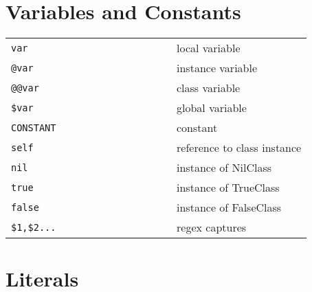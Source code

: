 \documentclass[6pt]{article}
\begin{document}
\begin{multicols}{3}
  \section{Variables and Constants}
  \begin{tabular}{L{0.55\linewidth} L{0.45\linewidth}}
    \tt var        & local variable              \\
    \tt @var       & instance variable           \\
    \tt @@var      & class variable              \\
    \tt \$var      & global variable             \\
    \tt CONSTANT   & constant                    \\
    \tt self       & reference to class instance \\
    \tt nil        & instance of NilClass        \\
    \tt true       & instance of TrueClass       \\
    \tt false      & instance of FalseClass      \\
    \tt \$1,\$2... & regex captures              \\
  \end{tabular}

  \section{Literals}

\end{multicols}
\end{document}
